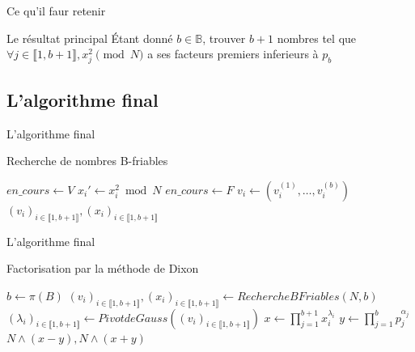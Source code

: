 \documentclass{beamer}
\begin{document}
\begin{frame}{Ce qu'il faur retenir}
    \begingroup
    \begin{block}{Le résultat principal}
        Étant donné $b\in \mathbb B$, trouver $b+1$ nombres tel que $\forall j\in\llbracket 1, b+1\rrbracket, x_j^2 \pmod N$ a ses facteurs premiers inferieurs à $p_b$
    \end{block}
    \endgroup
\end{frame}

\subsection{L'algorithme final}

\begin{frame}{L'algorithme final}
    \begin{algorithm}[H]
    \caption{Recherche de nombres B-friables}
    \small
    \begin{algorithmic}[1]
        \Statex
            \State $en\_cours \gets V$
                \State $x_i' \gets x_i^2 \bmod N$
                    \State $en\_cours \gets F$
                    \State $v_i \gets (v_i^{(1)}, \dots, v_i^{(b)})$
                \EndIf
            \EndWhile
        \EndFor
        \Statex
        \Return $(v_i)_{i \in \llbracket 1,b+1 \rrbracket}, (x_i)_{i \in \llbracket 1,b+1 \rrbracket}$
    \end{algorithmic}
    \end{algorithm}
\end{frame}

\begin{frame}{L'algorithme final}
    \begin{algorithm}[H]
    \caption{Factorisation par la méthode de Dixon}
    \begin{algorithmic}[1]
        \Statex
        \State $b \gets\pi(B)$
        \State $(v_i)_{i \in \llbracket 1,b+1 \rrbracket}, (x_i)_{i \in \llbracket 1,b+1 \rrbracket} \gets Recherche BFriables(N, b)$
        \State $(\lambda_i)_{i \in \llbracket 1,b+1 \rrbracket} \gets PivotdeGauss((v_i)_{i \in \llbracket 1,b+1 \rrbracket})$
        \State $x \gets \prod_{j=1}^{b+1}x_i^{\lambda_i}$
        \State $y \gets \prod_{j=1}^b p_j^{\alpha_j}$
        \Statex
        \Return $N \land(x-y), N\land(x+y)$
    \end{algorithmic}
    \end{algorithm}
\end{frame}
\end{document}
